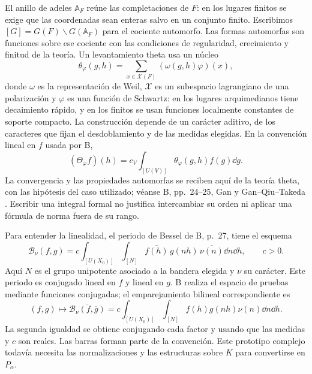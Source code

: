 El anillo de adeles $\mathbb A_F$ reúne las completaciones de $F$:
en los lugares finitos se exige que las coordenadas sean enteras salvo
en un conjunto finito. Escribimos
$[G]=G(F)\backslash G(\mathbb A_F)$ para el cociente automorfo.
Las formas automorfas son funciones sobre ese cociente con las
condiciones de regularidad, crecimiento y finitud de la teoría.
Un levantamiento theta usa un núcleo
\[
 \theta_\varphi(g,h)=\sum_{x\in\mathcal X(F)}
                          (\omega(g,h)\varphi)(x),
\]
donde $\omega$ es la representación de Weil, $\mathcal X$ es un
subespacio lagrangiano de una polarización y $\varphi$ es una función
de Schwartz: en los lugares arquimedianos tiene decaimiento rápido,
y en los finitos se usan funciones localmente constantes de soporte
compacto. La construcción depende de un carácter aditivo, de los
caracteres que fijan el desdoblamiento y de las medidas elegidas.
En la convención lineal en $f$ usada por B,
\begin{equation}
 (\Theta_\varphi f)(h)=c_V\int_{[U(V)]}
                         \theta_\varphi(g,h)f(g)\dd g.
 \label{eq:periodos-theta}
\end{equation}
La convergencia y las propiedades automorfas se reciben aquí de la
teoría theta, con las hipótesis del caso utilizado; véanse B, pp.~24--25,
Gan \cite[§§2--3]{gan-theta} y Gan--Qiu--Takeda
\cite[§11.2]{gqt-rallis}. Escribir una integral formal no justifica
intercambiar su orden ni aplicar una fórmula de norma fuera de su rango.

Para entender la linealidad, el periodo de Bessel de B, p.~27, tiene
el esquema
\begin{equation}
 \mathcal B_\nu(f,g)=c\int_{[U(X_0)]}\int_{[N]}
       \overline{f(h)}\,g(nh)\,\overline{\nu(n)}\dd n\dd h,
 \qquad c>0.
 \label{eq:periodos-bessel-sesqui}
\end{equation}
Aquí $N$ es el grupo unipotente asociado a la bandera elegida y
$\nu$ su carácter. Este periodo es conjugado lineal en $f$ y lineal
en $g$. B realiza el espacio de pruebas mediante funciones conjugadas;
el emparejamiento bilineal correspondiente es
\begin{equation}
 (f,g)\longmapsto\overline{\mathcal B_\nu(f,\overline g)}
   =c\int_{[U(X_0)]}\int_{[N]}f(h)g(nh)\nu(n)\dd n\dd h.
 \label{eq:periodos-bessel-bilineal}
\end{equation}
La segunda igualdad se obtiene conjugando cada factor y usando que
las medidas y $c$ son reales. Las barras forman parte de la convención.
Este prototipo complejo todavía necesita las normalizaciones y las
estructuras sobre $K$ para convertirse en $P_\alpha$.


